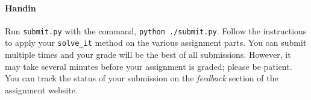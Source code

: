 \paragraph{Handin}
Run \texttt{submit.py} with the command, \texttt{python ./submit.py}.  Follow the instructions to apply your  \texttt{solve\_it} method on the various assignment parts.  You can submit multiple times and your grade will be the best of all submissions.  However, it may take several minutes before your assignment is graded; please be patient.  You can track the status of your submission on the {\em feedback} section of the assignment website.
